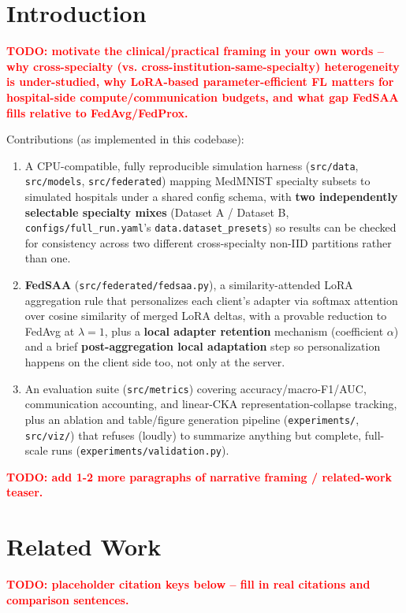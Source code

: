 \documentclass[11pt]{article}
\newcommand{\todo}[1]{\textcolor{red}{\textbf{TODO: #1}}}
\begin{document}
\section{Introduction}
\todo{motivate the clinical/practical framing in your own words -- why cross-specialty (vs.
cross-institution-same-specialty) heterogeneity is under-studied, why LoRA-based
parameter-efficient FL matters for hospital-side compute/communication budgets, and what gap
FedSAA fills relative to FedAvg/FedProx.}

Contributions (as implemented in this codebase):
\begin{enumerate}
  \item A CPU-compatible, fully reproducible simulation harness (\texttt{src/data},
    \texttt{src/models}, \texttt{src/federated}) mapping MedMNIST specialty subsets to simulated
    hospitals under a shared config schema, with \textbf{two independently selectable specialty
    mixes} (Dataset A / Dataset B, \texttt{configs/full\_run.yaml}'s \texttt{data.dataset\_presets})
    so results can be checked for consistency across two different cross-specialty non-IID
    partitions rather than one.
  \item \textbf{FedSAA} (\texttt{src/federated/fedsaa.py}), a similarity-attended LoRA
    aggregation rule that personalizes each client's adapter via softmax attention over cosine
    similarity of merged LoRA deltas, with a provable reduction to FedAvg at $\lambda=1$, plus a
    \textbf{local adapter retention} mechanism (coefficient $\alpha$) and a brief
    \textbf{post-aggregation local adaptation} step so personalization happens on the client side
    too, not only at the server.
  \item An evaluation suite (\texttt{src/metrics}) covering accuracy/macro-F1/AUC, communication
    accounting, and linear-CKA representation-collapse tracking, plus an ablation and
    table/figure generation pipeline (\texttt{experiments/}, \texttt{src/viz/}) that refuses
    (loudly) to summarize anything but complete, full-scale runs
    (\texttt{experiments/validation.py}).
\end{enumerate}
\todo{add 1-2 more paragraphs of narrative framing / related-work teaser.}

\section{Related Work}
\todo{placeholder citation keys below -- fill in real citations and comparison sentences.}
\end{document}

